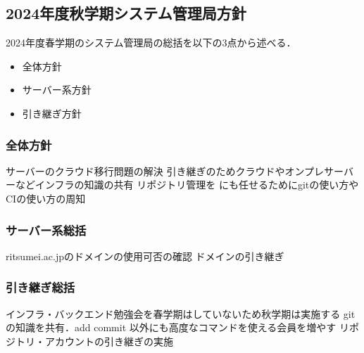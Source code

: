\subsection*{2024年度秋学期システム管理局方針}


2024年度春学期のシステム管理局の総括を以下の3点から述べる．
\begin{itemize}
    \item 全体方針
    \item サーバー系方針
    \item 引き継ぎ方針
\end{itemize}

\subsubsection*{全体方針}
サーバーのクラウド移行問題の解決
引き継ぎのためクラウドやオンプレサーバーなどインフラの知識の共有
リポジトリ管理を\firstGrade{} \secondGrade{}にも任せるためにgitの使い方やCIの使い方の周知

\subsubsection*{サーバー系総括}
ritsumei.ac.jpのドメインの使用可否の確認
ドメインの引き継ぎ

\subsubsection*{引き継ぎ総括}
インフラ・バックエンド勉強会を春学期はしていないため秋学期は実施する
gitの知識を共有．add commit 以外にも高度なコマンドを使える会員を増やす
リポジトリ・アカウントの引き継ぎの実施
